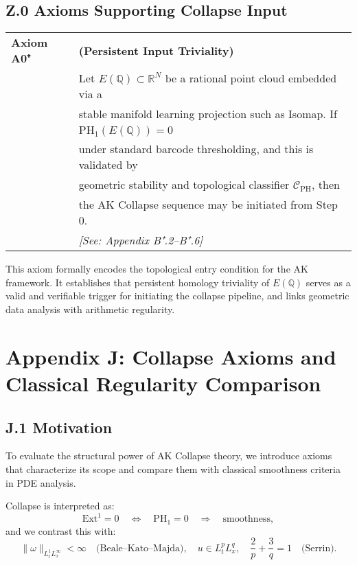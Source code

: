 \subsection*{Z.0 Axioms Supporting Collapse Input}

\begin{tabular}{ll}
\textbf{Axiom A0⁺} & \textbf{(Persistent Input Triviality)} \\
& Let \( E(\mathbb{Q}) \subset \mathbb{R}^N \) be a rational point cloud embedded via a \\
& stable manifold learning projection such as Isomap. If \\
& \quad \( \mathrm{PH}_1(E(\mathbb{Q})) = 0 \) \\
& under standard barcode thresholding, and this is validated by \\
& geometric stability and topological classifier \( \mathcal{C}_{\mathrm{PH}} \), then \\
& the AK Collapse sequence may be initiated from Step 0. \\
& \textit{[See: Appendix B⁺.2–B⁺.6]}
\end{tabular}

\vspace{1em}
\noindent
This axiom formally encodes the topological entry condition for the AK framework.  
It establishes that persistent homology triviality of \( E(\mathbb{Q}) \) serves as a valid and verifiable trigger  
for initiating the collapse pipeline, and links geometric data analysis with arithmetic regularity.



\section*{Appendix J: Collapse Axioms and Classical Regularity Comparison}

\subsection*{J.1 Motivation}

To evaluate the structural power of AK Collapse theory, we introduce  
axioms that characterize its scope and compare them with classical smoothness criteria in PDE analysis.

Collapse is interpreted as:
\[
\mathrm{Ext}^1 = 0 \quad \Leftrightarrow \quad \mathrm{PH}_1 = 0 \quad \Rightarrow \quad \text{smoothness},
\]
and we contrast this with:
\[
\|\omega\|_{L^1_t L^\infty_x} < \infty \quad \text{(Beale–Kato–Majda)}, \quad
u \in L^p_t L^q_x, \quad \frac{2}{p} + \frac{3}{q} = 1 \quad \text{(Serrin)}.
\]

